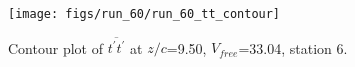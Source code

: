 \begin{figure}[H]
\centering
\texttt{[image: figs/run\_60/run\_60\_tt\_contour]}
\caption{Contour plot of $\overline{t^\prime t^\prime}$ at $z/c$=9.50, $V_{free}$=33.04, station 6.}
\end{figure}



